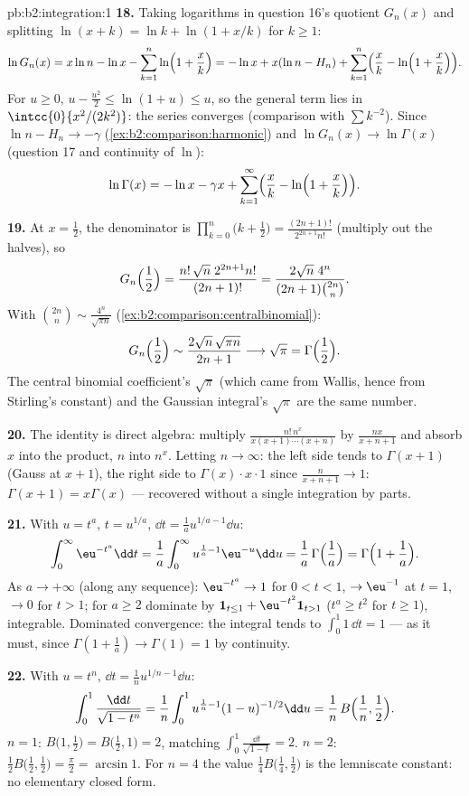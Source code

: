 \begin{solution}{pb:b2:integration:1}
\textbf{18.} Taking logarithms in question 16's quotient
$G_n(x)$ and splitting $\ln(x+k) = \ln k + \ln(1 + x/k)$ for $k
\geq 1$:
\[
\ln G_n(x) = x\ln n - \ln x - \sum_{k=1}^n
\ln\Bigl(1+\frac xk\Bigr)
= -\ln x + x(\ln n - H_n)
+ \sum_{k=1}^n\Bigl(\frac xk -
\ln\Bigl(1+\frac xk\Bigr)\Bigr).
\]
For $u \geq 0$, $u - \frac{u^2}2 \leq \ln(1+u) \leq u$, so the
general term lies in $\intcc{0}{x^2/(2k^2)}$: the series
converges (comparison with $\sum k^{-2}$). Since $\ln n - H_n
\to -\gamma$ (\cref{ex:b2:comparison:harmonic}) and $\ln G_n(x)
\to \ln\Gamma(x)$ (question 17 and continuity of $\ln$):
\[
\ln\Gamma(x) = -\ln x - \gamma x
+ \sum_{k=1}^\infty\Bigl(\frac xk -
\ln\Bigl(1+\frac xk\Bigr)\Bigr) .
\]

\textbf{19.} At $x = \frac12$, the denominator is
$\prod_{k=0}^n\bigl(k+\frac12\bigr) =
\frac{(2n+1)!}{2^{2n+1}n!}$ (multiply out the halves), so
\[
G_n\Bigl(\frac12\Bigr)
= \frac{n!\,\sqrt n\;2^{2n+1}n!}{(2n+1)!}
= \frac{2\sqrt n\;4^n}{(2n+1)\binom{2n}{n}} .
\]
With $\binom{2n}{n} \sim \frac{4^n}{\sqrt{\pi n}}$
(\cref{ex:b2:comparison:centralbinomial}):
\[
G_n\Bigl(\frac12\Bigr)
\sim \frac{2\sqrt n\,\sqrt{\pi n}}{2n+1}
\longrightarrow \sqrt\pi = \Gamma\Bigl(\frac12\Bigr) .
\]
The central binomial coefficient's $\sqrt\pi$ (which came from
Wallis, hence from Stirling's constant) and the Gaussian
integral's $\sqrt\pi$ are the same number.

\textbf{20.} The identity is direct algebra: multiply
$\frac{n!\,n^x}{x(x+1)\cdots(x+n)}$ by $\frac{nx}{x+n+1}$ and
absorb $x$ into the product, $n$ into $n^x$. Letting $n \to
\infty$: the left side tends to $\Gamma(x+1)$ (Gauss at $x+1$),
the right side to $\Gamma(x)\cdot x\cdot 1$ since
$\frac{n}{x+n+1} \to 1$: $\Gamma(x+1) = x\Gamma(x)$ ---
recovered without a single integration by parts.

\textbf{21.} With $u = t^a$, $t = u^{1/a}$, $\dd t = \frac1a
u^{1/a - 1}\dd u$:
\[
\int_0^\infty \eu^{-t^a}\dd t
= \frac1a\int_0^\infty u^{\frac1a - 1}\eu^{-u}\dd u
= \frac1a\,\Gamma\Bigl(\frac1a\Bigr)
= \Gamma\Bigl(1 + \frac1a\Bigr) .
\]
As $a \to +\infty$ (along any sequence): $\eu^{-t^a} \to 1$ for
$0 < t < 1$, $\to \eu^{-1}$ at $t = 1$, $\to 0$ for $t > 1$;
for $a \geq 2$ dominate by $\mathbf 1_{t \leq 1} +
\eu^{-t^2}\mathbf 1_{t > 1}$ ($t^a \geq t^2$ for $t \geq 1$),
integrable. Dominated convergence: the integral tends to
$\int_0^1 1\,\dd t = 1$ --- as it must, since $\Gamma(1 +
\frac1a) \to \Gamma(1) = 1$ by continuity.

\textbf{22.} With $u = t^n$, $\dd t = \frac1n u^{1/n - 1}\dd
u$:
\[
\int_0^1 \frac{\dd t}{\sqrt{1-t^n}}
= \frac1n\int_0^1 u^{\frac1n-1}(1-u)^{-1/2}\dd u
= \frac1n\,B\Bigl(\frac1n, \frac12\Bigr) .
\]
$n = 1$: $B\bigl(1,\frac12\bigr) = B\bigl(\frac12,1\bigr) = 2$,
matching $\int_0^1\frac{\dd t}{\sqrt{1-t}} = 2$. $n = 2$:
$\frac12 B\bigl(\frac12,\frac12\bigr) = \frac\pi2 = \arcsin 1$.
For $n = 4$ the value $\frac14 B\bigl(\frac14,\frac12\bigr)$ is
the lemniscate constant: no elementary closed form.


\end{solution}
